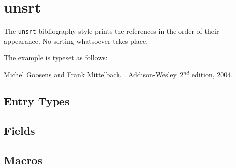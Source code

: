 
\section{unsrt}

The \texttt{unsrt} bibliography style prints the references in the
order of their appearance. No sorting whatsoever takes place.

\INCOMPLETE

The example is typeset as follows:
\begin{BstSample}
\begin{thebibliography}{10}

Michel Goosens and Frank Mittelbach.
.
\newblock Addison-Wesley, 2\(^{nd}\) edition, 2004.

\end{thebibliography}
\end{BstSample}

\subsection*{Entry Types}


\subsection*{Fields}


\subsection*{Macros}

